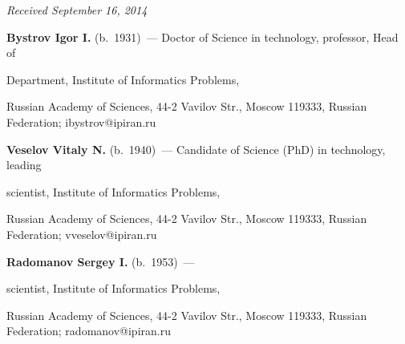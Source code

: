 \vspace*{-6pt}





\hfill{\small\textit{Received September 16, 2014}}





\Contr





\noindent


\textbf{Bystrov Igor I.} (b.\ 1931)~--- Doctor of Science in technology, professor, Head of


Department, Institute of Informatics Problems,


Russian Academy of Sciences, 44-2 Vavilov Str., Moscow 119333, Russian Federation; ibystrov@ipiran.ru





\vspace*{3pt}





\noindent


\textbf{Veselov Vitaly N.} (b.\ 1940)~--- Candidate of Science (PhD) in technology, leading


scientist, Institute of Informatics Problems,


Russian Academy of Sciences, 44-2 Vavilov Str., Moscow 119333, Russian Federation; vveselov@ipiran.ru





\vspace*{3pt}





\noindent


\textbf{Radomanov Sergey I.} (b.\ 1953)~---


scientist, Institute of Informatics Problems,


Russian Academy of Sciences, 44-2 Vavilov Str., Moscow 119333, Russian Federation; radomanov@ipiran.ru











 \label{end\stat}





\renewcommand{\bibname}{\protect\rm Литература}





